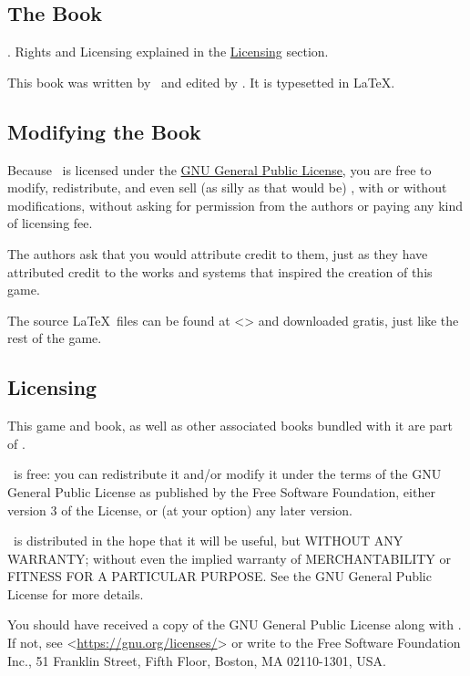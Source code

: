 \subsection{The Book}
\par
{} \zandy . Rights and Licensing explained in the \hyperlink{Licensing}{Licensing} section. 

\par
This book was written by \zandy\, and edited by \sam . It is typesetted in \LaTeX .

\subsection{Modifying the Book}

\par
Because \getTitle\, is licensed under the \hyperlink{Licensing}{GNU General Public License}, you are free to modify, redistribute, and even sell (as silly as that would be) \getTitle , with or without modifications, without asking for permission from the authors or paying any kind of licensing fee.

\par
The authors ask that you would attribute credit to them, just as they have attributed credit to the works and systems that inspired the creation of this game.

\par
The source \LaTeX\, files can be found at <\website > and downloaded gratis, just like the rest of the game.

\subsection{Licensing}
\par
\hypertarget{Licensing}{This game and book, as well as other associated books bundled with it are part of \getTitle .}

\par
\getTitle\, is free: you can redistribute it and/or modify it under the terms of the GNU General Public License as published by the Free Software Foundation, either version 3 of the License, or (at your option) any later version.

\par
\getTitle\, is distributed in the hope that it will be useful, but WITHOUT ANY WARRANTY; without even the implied warranty of MERCHANTABILITY or FITNESS FOR A PARTICULAR PURPOSE. See the GNU General Public License for more details.

You should have received a copy of the GNU General Public License along with \getTitle . If not, see <\href{https://gnu.org/licenses/}{https://gnu.org/licenses/}> or write to the Free Software Foundation Inc., 51 Franklin Street, Fifth Floor, Boston, MA 02110-1301, USA.
